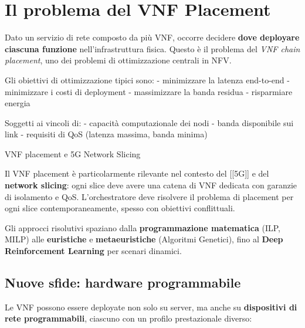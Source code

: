 \documentclass[
  italian,
  openany]{book}
\begin{document}
\section{Il problema del VNF
Placement}\label{il-problema-del-vnf-placement}

Dato un servizio di rete composto da più VNF, occorre decidere
\textbf{dove deployare ciascuna funzione} nell'infrastruttura fisica.
Questo è il problema del \emph{VNF chain placement}, uno dei problemi di
ottimizzazione centrali in NFV.

Gli obiettivi di ottimizzazione tipici sono: - minimizzare la latenza
end-to-end - minimizzare i costi di deployment - massimizzare la banda
residua - risparmiare energia

Soggetti ai vincoli di: - capacità computazionale dei nodi - banda
disponibile sui link - requisiti di QoS (latenza massima, banda minima)

\begin{callouttip}{VNF placement e 5G Network Slicing}

Il VNF placement è particolarmente rilevante nel contesto del
{[}{[}5G{]}{]} e del \textbf{network slicing}: ogni slice deve avere una
catena di VNF dedicata con garanzie di isolamento e QoS. L'orchestratore
deve risolvere il problema di placement per ogni slice
contemporaneamente, spesso con obiettivi conflittuali.

\end{callouttip}

Gli approcci risolutivi spaziano dalla \textbf{programmazione
matematica} (ILP, MILP) alle \textbf{euristiche} e
\textbf{metaeuristiche} (Algoritmi Genetici), fino al \textbf{Deep
Reinforcement Learning} per scenari dinamici.

\subsection{Nuove sfide: hardware
programmabile}\label{nuove-sfide-hardware-programmabile}

Le VNF possono essere deployate non solo su server, ma anche su
\textbf{dispositivi di rete programmabili}, ciascuno con un profilo
prestazionale diverso:
\end{document}
